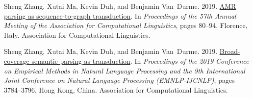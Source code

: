 \documentclass[11pt,a4paper]{article}
\begin{document}
\begin{thebibliography}{27}
Sheng Zhang, Xutai Ma, Kevin Duh, and Benjamin Van~Durme. 2019{}.
\newblock \href {https://doi.org/10.18653/v1/P19-1009} {{AMR} parsing as
  sequence-to-graph transduction}.
\newblock In \emph{Proceedings of the 57th Annual Meeting of the Association
  for Computational Linguistics}, pages 80--94, Florence, Italy. Association
  for Computational Linguistics.

Sheng Zhang, Xutai Ma, Kevin Duh, and Benjamin Van~Durme. 2019{}.
\newblock \href {https://www.aclweb.org/anthology/D19-1392} {Broad-coverage
  semantic parsing as transduction}.
\newblock In \emph{Proceedings of the 2019 Conference on Empirical Methods in
  Natural Language Processing and the 9th International Joint Conference on
  Natural Language Processing (EMNLP-IJCNLP)}, pages 3784--3796, Hong Kong,
  China. Association for Computational Linguistics.

\end{thebibliography}
 
\end{document}
